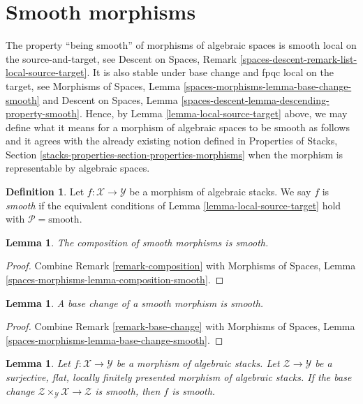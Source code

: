 \documentclass{stacks-project}
\theoremstyle{plain}
\newtheorem{lemma}[subsection]{Lemma}
\theoremstyle{definition}
\newtheorem{definition}[subsection]{Definition}
\theoremstyle{remark}
\numberwithin{equation}{subsection}
\begin{document}
\section{Smooth morphisms}
\label{section-smooth}

\noindent
The property ``being smooth'' of morphisms of algebraic
spaces is smooth local on the source-and-target, see
Descent on Spaces, Remark \ref{spaces-descent-remark-list-local-source-target}.
It is also stable under base change and fpqc local on the target, see
Morphisms of Spaces,
Lemma \ref{spaces-morphisms-lemma-base-change-smooth}
and
Descent on Spaces, Lemma
\ref{spaces-descent-lemma-descending-property-smooth}.
Hence, by
Lemma \ref{lemma-local-source-target}
above, we may define what it means for a morphism of algebraic spaces
to be smooth as follows and it agrees with the already
existing notion defined in
Properties of Stacks,
Section \ref{stacks-properties-section-properties-morphisms}
when the morphism is representable by algebraic spaces.

\begin{definition}
\label{definition-smooth}
Let $f : \mathcal{X} \to \mathcal{Y}$ be a morphism of algebraic stacks.
We say $f$ is {\it smooth} if the equivalent conditions of
Lemma \ref{lemma-local-source-target}
hold with $\mathcal{P} = \text{smooth}$.
\end{definition}

\begin{lemma}
\label{lemma-composition-smooth}
The composition of smooth morphisms is smooth.
\end{lemma}

\begin{proof}
Combine
Remark \ref{remark-composition}
with
Morphisms of Spaces, Lemma
\ref{spaces-morphisms-lemma-composition-smooth}.
\end{proof}

\begin{lemma}
\label{lemma-base-change-smooth}
A base change of a smooth morphism is smooth.
\end{lemma}

\begin{proof}
Combine
Remark \ref{remark-base-change}
with
Morphisms of Spaces, Lemma
\ref{spaces-morphisms-lemma-base-change-smooth}.
\end{proof}

\begin{lemma}
\label{lemma-descent-smooth}
Let $f : \mathcal{X} \to \mathcal{Y}$ be a morphism of algebraic stacks.
Let $\mathcal{Z} \to \mathcal{Y}$ be a surjective, flat, locally finitely
presented morphism of algebraic stacks. If the base change
$\mathcal{Z} \times_\mathcal{Y} \mathcal{X} \to \mathcal{Z}$
is smooth, then $f$ is smooth.
\end{lemma}
\end{document}
